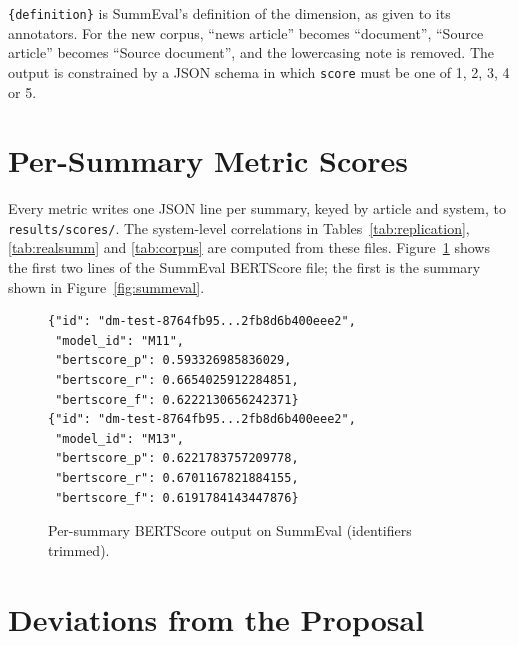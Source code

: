 \documentclass[11pt]{article}
\begin{document}
\texttt{\{definition\}} is SummEval's definition of the dimension, as given to its annotators. For the new corpus, ``news article'' becomes ``document'', ``Source article'' becomes ``Source document'', and the lowercasing note is removed. The output is constrained by a JSON schema in which \texttt{score} must be one of 1, 2, 3, 4 or 5.

\section{Per-Summary Metric Scores}
\label{app:scores}

Every metric writes one JSON line per summary, keyed by article and system, to \texttt{results/scores/}. The system-level correlations in Tables~\ref{tab:replication}, \ref{tab:realsumm} and \ref{tab:corpus} are computed from these files. Figure~\ref{fig:scores} shows the first two lines of the SummEval BERTScore file; the first is the summary shown in Figure~\ref{fig:summeval}.

\begin{figure}[ht]
\footnotesize
\begin{verbatim}
{"id": "dm-test-8764fb95...2fb8d6b400eee2",
 "model_id": "M11",
 "bertscore_p": 0.593326985836029,
 "bertscore_r": 0.6654025912284851,
 "bertscore_f": 0.6222130656242371}
{"id": "dm-test-8764fb95...2fb8d6b400eee2",
 "model_id": "M13",
 "bertscore_p": 0.6221783757209778,
 "bertscore_r": 0.6701167821884155,
 "bertscore_f": 0.6191784143447876}
\end{verbatim}
\caption{Per-summary BERTScore output on SummEval (identifiers trimmed).}
\label{fig:scores}
\end{figure}

\newpage
\section{Deviations from the Proposal}
\label{app:deviations}
\end{document}
